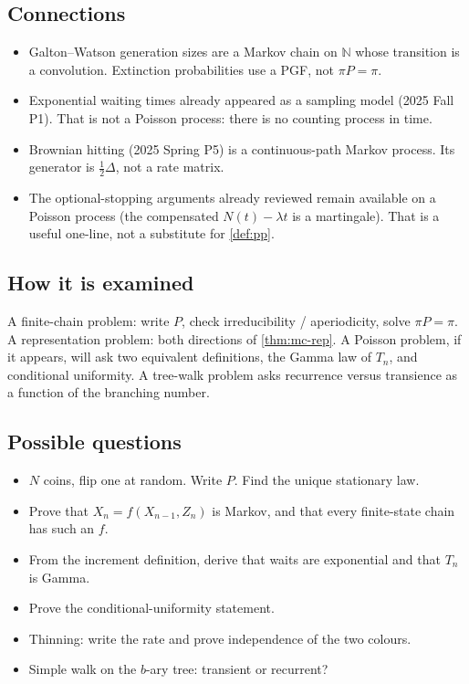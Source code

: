 \subsection{Connections}

\begin{itemize}
    \item Galton--Watson generation sizes are a Markov chain on \(\mathbb{N}\) whose transition is a convolution. Extinction probabilities use a PGF, not \(\pi P=\pi\).
    \item Exponential waiting times already appeared as a sampling model (2025 Fall P1). That is not a Poisson process: there is no counting process in time.
    \item Brownian hitting (2025 Spring P5) is a continuous-path Markov process. Its generator is \(\tfrac12\Delta\), not a rate matrix.
    \item The optional-stopping arguments already reviewed remain available on a Poisson process (the compensated \(N(t)-\lambda t\) is a martingale). That is a useful one-line, not a substitute for \cref{def:pp}.
\end{itemize}

\subsection{How it is examined}

A finite-chain problem: write \(P\), check irreducibility / aperiodicity, solve \(\pi P=\pi\). A representation problem: both directions of \cref{thm:mc-rep}. A Poisson problem, if it appears, will ask two equivalent definitions, the Gamma law of \(T_{n}\), and conditional uniformity. A tree-walk problem asks recurrence versus transience as a function of the branching number.

\subsection{Possible questions}

\begin{itemize}
    \item \(N\) coins, flip one at random. Write \(P\). Find the unique stationary law.
    \item Prove that \(X_{n}=f(X_{n-1},Z_{n})\) is Markov, and that every finite-state chain has such an \(f\).
    \item From the increment definition, derive that waits are exponential and that \(T_{n}\) is Gamma.
    \item Prove the conditional-uniformity statement.
    \item Thinning: write the rate and prove independence of the two colours.
    \item Simple walk on the \(b\)-ary tree: transient or recurrent?
\end{itemize}

